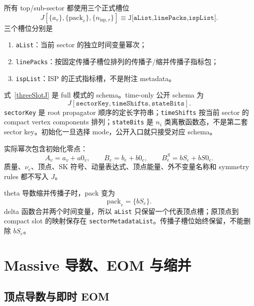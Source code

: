 ﻿\documentclass[a4paper,11pt]{article}
\begin{document}
所有 top/sub-sector 都使用三个正式槽位
\begin{equation}
 \boxed{
 J\!\left[
   \{a_v\},
   \{\mathrm{pack}_e\},
   \{n_{\mathrm{isp},r}\}
 \right]}
 \equiv
 \texttt{J[aList,linePacks,ispList]}.
 \label{threeSlotJ}
\end{equation}
三个槽位分别是
\begin{enumerate}
  \item \texttt{aList}：当前 sector 的独立时间变量幂次；
  \item \texttt{linePacks}：按固定传播子槽位排列的传播子/缩并传播子指标包；
  \item \texttt{ispList}：ISP 的正式指标槽，不是附注 metadata。
\end{enumerate}

式~\eqref{threeSlotJ} 是 full 模式的 schema。time-only 公开 schema 为
\begin{equation}
 \boxed{J[\texttt{sectorKey},\texttt{timeShifts},\texttt{stateBits}]}.
 \label{timeOnlyPublicJ}
\end{equation}
\texttt{sectorKey} 是 root propagator 顺序的定长字符串；\texttt{timeShifts} 按当前 sector 的 compact vertex components 排列；\texttt{stateBits} 是 $n_i$ 类离散函数态，不是第二套 sector key。初始化一旦选择 mode，公开入口就只接受对应 schema。

实际幂次包含初始化零点：
\begin{equation}
 A_v=a_v+a0_v,\qquad
 B_e=b_e+b0_e,\qquad
 B^S_e=bS_e+bS0_e.
\end{equation}
质量、$\nu_e$、顶点、SK 符号、动量表达式、顶点能量、外不变量名称和 symmetry rules 都不写入 $J$。

theta 导数缩并传播子时，pack 变为
\begin{equation}
  \mathrm{pack}_e=\{bS_e\}.
\end{equation}
delta 函数合并两个时间变量，所以 \texttt{aList} 只保留一个代表顶点槽；原顶点到 compact slot 的映射保存在 \texttt{sectorMetadataList}。传播子槽位始终保留，不能删除 $bS_e$。

\section{Massive 导数、EOM 与缩并}

\subsection{顶点导数与即时 EOM}
\end{document}
